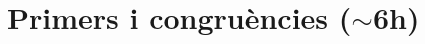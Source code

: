 \documentclass[11pt,fleqn]{book} %
\newcounter{let} \setcounter{let}{0}
\renewcommand{\1}{\mathbf{1}}
\newcommand{\0}{\mathbf{0}}
\begin{document}
\usechapterimagefalse %

\pagestyle{empty} %

\tableofcontents %

\cleardoublepage %

\pagestyle{fancy} %




\usechapterimagefalse
\chapter{Primers i congruències \texorpdfstring{($\sim$6h)}{}}
{
\let\paragraph\subsubsection
\let\subsubsection\subsection
\let\subsection\section


}
\end{document}
